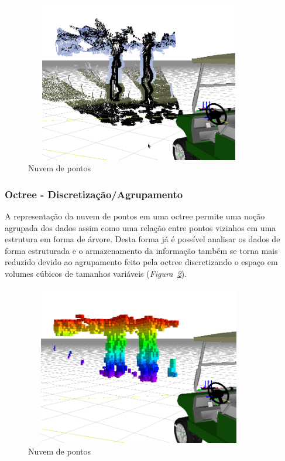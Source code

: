 \documentclass{article}
\newcommand{\fig}[1]{\textit{Figura~\ref{#1}}}
\begin{document}
\begin{figure}[!h]
  	\centering
    \includegraphics[width=10cm,height=7cm,]{../images/arq_cloud.png}
 	\caption{Nuvem de pontos}
 	\label{fig:cloud}
\end{figure}


\subsubsection{Octree - Discretização/Agrupamento}

A representação da nuvem de pontos em uma octree permite uma noção agrupada
dos dados assim como uma relação entre pontos vizinhos em uma estrutura em
forma de árvore. Desta forma já é possível analisar os dados de forma
estruturada e o armazenamento da informação também se torna mais reduzido devido
ao agrupamento feito pela octree discretizando o espaço em volumes cúbicos de
tamanhos variáveis (\fig{fig:octo}).


\begin{figure}[!h]
  	\centering
    \includegraphics[width=10cm,height=7cm,]{../images/arq_octomap.png}
 	\caption{Nuvem de pontos}
 	\label{fig:octo}
\end{figure}
\end{document}
